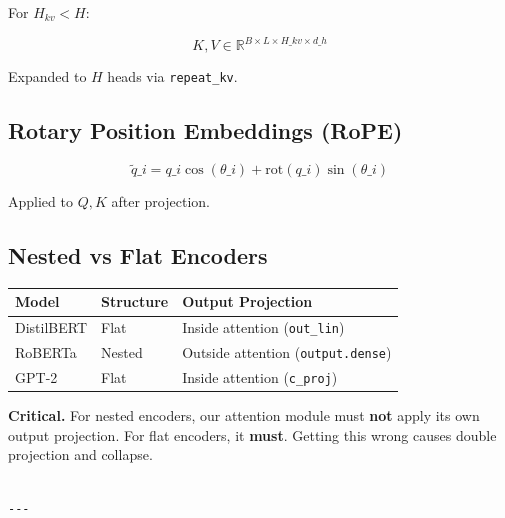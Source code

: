 For $H_{kv} < H$:

\[
K, V \in \mathbb{R}^{B \times L \times H\_{kv} \times d\_h}
\]

Expanded to $H$ heads via \texttt{repeat\_kv}.

\subsection{Rotary Position Embeddings (RoPE)}

\[
\tilde{q}\_i = q\_i \cos(\theta\_i) + \text{rot}(q\_i) \sin(\theta\_i)
\]

Applied to $Q, K$ after projection.

\subsection{Nested vs Flat Encoders}

\begin{table}[H]
\centering
\small
\begin{tabular}{lll}
\toprule
\textbf{Model} & \textbf{Structure} & \textbf{Output Projection} \\
\midrule
DistilBERT & Flat & Inside attention (\texttt{out\_lin}) \\
RoBERTa & Nested & Outside attention (\texttt{output.dense}) \\
GPT-2 & Flat & Inside attention (\texttt{c\_proj}) \\
\bottomrule
\end{tabular}
\end{table}

\textbf{Critical.} For nested encoders, our attention module must \textbf{not} apply 
its own output projection. For flat encoders, it \textbf{must}. Getting this 
wrong causes double projection and collapse.
\begin{lstlisting}

---
\end{lstlisting}